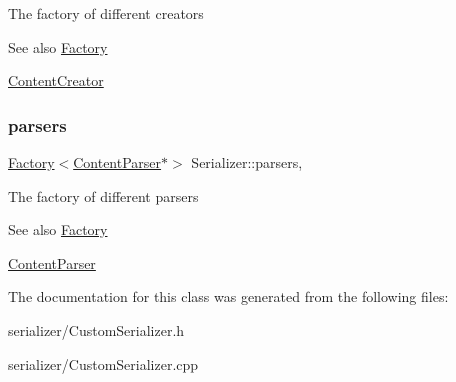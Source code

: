 The factory of different creators \begin{DoxySeeAlso}{See also}
\mbox{\hyperlink{classFactory}{Factory}} 

\mbox{\hyperlink{classContentCreator}{Content\+Creator}} 
\end{DoxySeeAlso}
\mbox{\label{classSerializer_a96f96c01e6a471513669621751591fd9}} 
\subsubsection{\texorpdfstring{parsers}{parsers}}
{\footnotesize\ttfamily \mbox{\hyperlink{classFactory}{Factory}}$<$\mbox{\hyperlink{classContentParser}{Content\+Parser}}$\ast$$>$ Serializer\+::parsers\hspace{0.3cm}{\ttfamily [protected]}, {\ttfamily [inherited]}}

The factory of different parsers \begin{DoxySeeAlso}{See also}
\mbox{\hyperlink{classFactory}{Factory}} 

\mbox{\hyperlink{classContentParser}{Content\+Parser}} 
\end{DoxySeeAlso}


The documentation for this class was generated from the following files\+:\begin{DoxyCompactItemize}
\item 
serializer/Custom\+Serializer.\+h\item 
serializer/Custom\+Serializer.\+cpp\end{DoxyCompactItemize}
